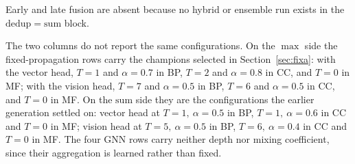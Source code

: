 \documentclass[Ingles]{ic-tese-v3}
\begin{document}
\begin{table}[!htb]
  \centering
  \caption{Edge deduplication regime ($wF_{\max}$, validation set). Each cell is the champion of its family under that regime, selected by validation $wF_{\max}$. $\Delta$ is $\max$ minus $\mathrm{sum}$ on the AVG column, in percentage points.}
  \label{tab:dedup}
  \small
  \par\smallskip\footnotesize\raggedright Early and late fusion are absent because no hybrid or ensemble run exists in the $\mathrm{dedup}=\mathrm{sum}$ block.
\end{table}

The two columns do not report the same configurations. On the $\max$ side the
fixed-propagation rows carry the champions selected in
Section~\ref{sec:fixa}: with the vector head, $T=1$ and $\alpha=0.7$ in
BP, $T=2$ and $\alpha=0.8$ in CC, and $T=0$ in MF; with the vision head, $T=7$ and
$\alpha=0.5$ in BP, $T=6$ and $\alpha=0.5$ in CC, and $T=0$ in MF. On the
$\mathrm{sum}$ side they are the configurations the earlier generation settled on: vector
head at $T=1,\ \alpha=0.5$ in BP, $T=1,\ \alpha=0.6$ in CC and $T=0$ in MF; vision head at
$T=5,\ \alpha=0.5$ in BP, $T=6,\ \alpha=0.4$ in CC and $T=0$ in MF. The four GNN rows carry
neither depth nor mixing coefficient, since their aggregation is learned rather than fixed.
\end{document}
